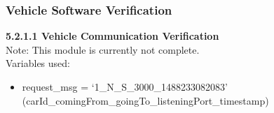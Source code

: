 \documentclass [10pt]{article}
\begin{document}
\subsubsection{Vehicle Software Verification}



    
    
    
    
     

    
    
    \textbf{5.2.1.1 Vehicle Communication Verification} \vspace{2mm}\\
    Note: This module is currently not complete. \\
    Variables used:
    \begin{itemize}[topsep=0pt]
        \item request\_msg = `1\_N\_S\_3000\_1488233082083' (carId\_comingFrom\_goingTo\_listeningPort\_timestamp)
    \end{itemize}
    \vspace{0.5cm}
    
\end{document}
